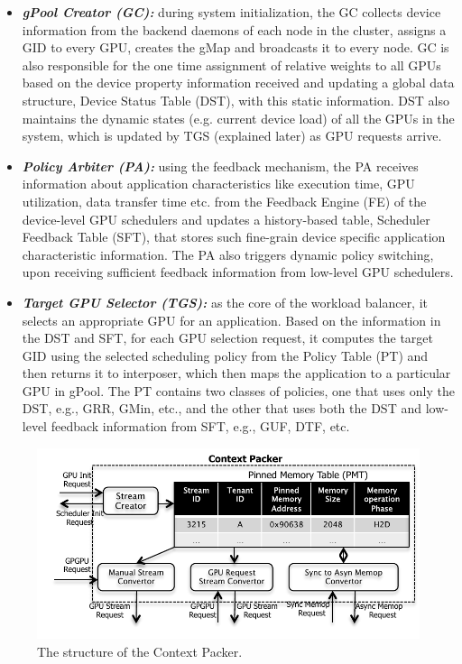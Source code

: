 \begin{itemize}
\item \textbf{\textit{gPool Creator (GC): }}during system initialization, the GC collects device information from the backend daemons of each  node  in  the cluster, assigns a GID to every GPU, creates the gMap and broadcasts it to every node. GC is also responsible for the one time assignment of relative weights to all GPUs based on the device property information received and updating a global data structure, Device Status Table (DST), with this static information. DST also maintains the dynamic states (e.g. current device load) of all the GPUs in the system, which is updated by TGS (explained later) as GPU requests arrive. 
\item \textbf{\textit{Policy Arbiter (PA): }}using the feedback mechanism, the PA receives information about application characteristics like execution time, GPU utilization, data transfer time etc. from the Feedback Engine (FE) of the device-level GPU schedulers and updates a history-based table, Scheduler Feedback Table (SFT), that stores such fine-grain device specific application characteristic information. The PA also triggers dynamic policy switching, upon receiving sufficient feedback information from low-level GPU schedulers.
\item \textbf{\textit{Target GPU Selector (TGS): }}as the core of the workload balancer, it selects an appropriate GPU for an application. Based on the information in the DST and SFT, for each GPU selection request, it computes the target GID using the selected scheduling policy from the Policy Table (PT) and then returns it to interposer, which then maps the application to a particular GPU in gPool. The PT contains two classes of policies, one that uses only the DST, e.g., GRR, GMin, etc., and the other that uses both the DST and low-level feedback information from SFT, e.g., GUF, DTF, etc.
\end{itemize}
\begin{figure}[!t]
\centering
\includegraphics[width=\textwidth,height=\textheight,keepaspectratio]{figures/strings_archi3.pdf}
\caption{The structure of the Context Packer.}
\label{fig:packer}
\end{figure}
